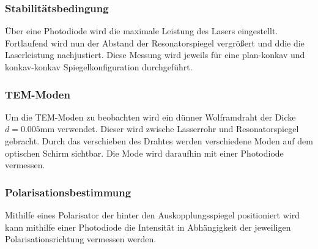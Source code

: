 \subsubsection{Stabilitätsbedingung}
Über eine Photodiode wird die maximale Leistung des Lasers eingestellt. Fortlaufend wird nun der Abstand der Resonatorspiegel
vergrößert und ddie die Laserleistung nachjustiert. Diese Messung wird jeweils für eine plan-konkav und konkav-konkav Spiegelkonfiguration durchgeführt.
\subsubsection{TEM-Moden}
Um die TEM-Moden zu beobachten wird ein dünner Wolframdraht der Dicke $d=0.005$mm verwendet. Dieser wird zwische Lasserrohr und Resonatorspiegel gebracht.
Durch das verschieben des Drahtes werden verschiedene Moden auf dem optischen Schirm sichtbar. Die Mode wird daraufhin mit einer Photodiode vermessen.
\subsubsection{Polarisationsbestimmung}
Mithilfe eines Polarisator der hinter den Auskopplungsspiegel positioniert wird kann mithilfe einer Photodiode die Intensität in Abhängigkeit
der jeweiligen Polarisationsrichtung vermessen werden. 

\label{sec:Durchfuehrung}
